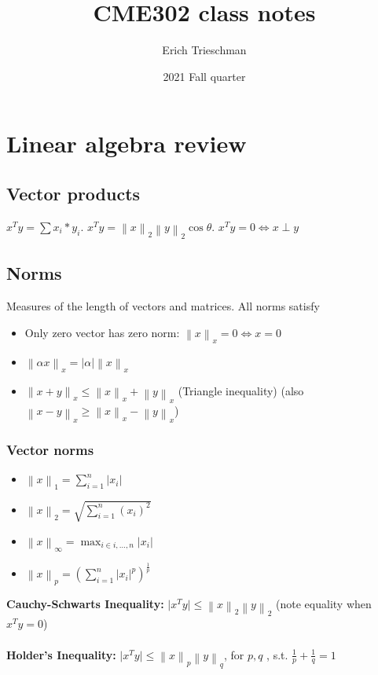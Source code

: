 \documentclass{article}
\title{CME302 class notes}
\author{Erich Trieschman}
\date{2021 Fall quarter}
\newcommand{\norm}[2]{\left\lVert#1\right\rVert_#2}
\newcommand{\abs}[1]{\lvert#1\rvert}
\begin{document}
\section{Linear algebra review}

\subsection{Vector products}
$x^Ty = \sum x_i*y_i$. $x^Ty = \norm{x}{2}\norm{y}{2}\cos\theta$.
$x^Ty = 0 \Leftrightarrow x \perp y$

\subsection{Norms}
Measures of the length of vectors and matrices. All norms satisfy
\begin{itemize}
    \item Only zero vector has zero norm: $\norm{x}{x} = 0 \Leftrightarrow x = 0$
    \item $\norm{\alpha x}{x} = \abs{\alpha}\norm{x}{x}$
    \item $\norm{x+y}{x} \leq \norm{x}{x} + \norm{y}{x}$ (Triangle inequality)
    (also $\norm{x-y}{x} \geq \norm{x}{x} - \norm{y}{x}$)
\end{itemize}

\subsubsection{Vector norms}
\begin{itemize}
    \item $\norm{x}{1} = \sum_{i=1}^n \abs{x_i}$
    \item $\norm{x}{2} = \sqrt{\sum_{i=1}^n (x_i)^2}$
    \item $\norm{x}{\infty} = \max_{i \in i,\dots, n} \abs{x_i}$
    \item $\norm{x}{p} = (\sum_{i=1}^n \abs{x_i}^p)^{\frac{1}{p}}$
\end{itemize}
\textbf{Cauchy-Schwarts Inequality:} $\abs{x^Ty}\leq \norm{x}{2}\norm{y}{2}$ (note equality when $x^Ty = 0$)\\ \\
\textbf{Holder's Inequality:} $\abs{x^Ty} \leq \norm{x}{p}\norm{y}{q}$, for $p, q$ , s.t. $\frac{1}{p} + \frac{1}{q} = 1$
\end{document}
